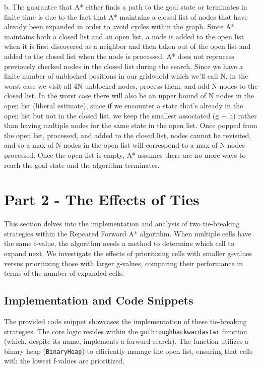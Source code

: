 \documentclass[12pt]{article}
\begin{document}
b. The guarantee that A* either finds a path to the goal state or terminates in finite time is due to the fact that A* maintains a closed list of nodes that have already been expanded in order to avoid cycles within the graph.
Since A* maintains both a closed list and an open list, a node is added to the open list when it is first discovered as a neighbor and then taken out of the open list and added to the closed list when the node is processed.
A* does not reprocess previously checked nodes in the closed list during the search.
Since we have a finite number of unblocked positions in our gridworld which we'll call N, in the worst case we visit all 4N unblocked nodes, process them, and add N nodes to the closed list.
In the worst case there will also be an upper bound of N nodes in the open list (liberal estimate), since if we encounter a state that's already in the open list but not in the closed list, we keep the smallest associated (g + h) rather than having multiple nodes for the same state in the open list.
Once popped from the open list, processed, and added to the closed list, nodes cannot be revisited, and so a max of N nodes in the open list will correspond to a max of N nodes processed.
Once the open list is empty, A* assumes there are no more ways to reach the goal state and the algorithm terminates.






\section{Part 2 - The Effects of Ties}

This section delves into the implementation and analysis of two tie-breaking strategies within the Repeated Forward A* algorithm. 
When multiple cells have the same f-value, 
the algorithm needs a method to determine which cell to expand next. 
We investigate the effects of prioritizing cells with smaller g-values versus prioritizing those with larger g-values, 
comparing their performance in terms of the number of expanded cells.

\subsection{Implementation and Code Snippets}

The provided code snippet showcases the implementation of these tie-breaking strategies. 
The core logic resides within the \texttt{gothroughbackwardastar} function 
(which, despite its name, implements a forward search). 
The function utilizes a binary heap (\texttt{BinaryHeap}) to efficiently manage the open list, 
ensuring that cells with the lowest f-values are prioritized.
\end{document}
